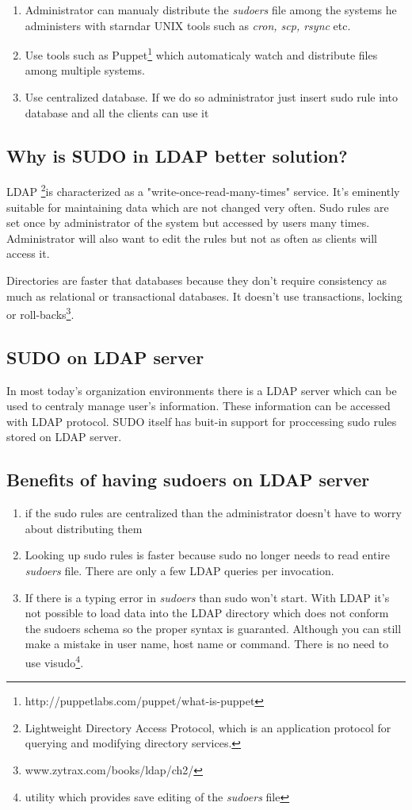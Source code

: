\documentclass[12pt,a4paper,titlepage,final]{article}
\begin{document}
\begin{enumerate} 
	\item Administrator can manualy distribute the \emph{sudoers} file among the
		systems he administers with starndar UNIX tools such as \emph{cron, scp,
		rsync} etc.
	\item Use tools such as
		Puppet\footnote{http://puppetlabs.com/puppet/what-is-puppet} which
		automaticaly watch and distribute files among multiple systems.
	\item Use centralized database. If we do so administrator just insert sudo
		rule into database and all the clients can use it
\end{enumerate}

\subsection{Why is SUDO in LDAP better solution?}
LDAP \footnote{Lightweight Directory Access Protocol, which is an application
protocol for querying and modifying directory services.}is characterized as a
"write-once-read-many-times" service. It's eminently suitable for maintaining
data which are not changed very often. Sudo rules are set once by administrator
of the system but accessed by users many times.  Administrator will also want to
edit the rules but not as often as clients will access it.

Directories are faster that databases because they don't require consistency as
much as relational or transactional databases. It doesn't use transactions,
locking or roll-backs\footnote{www.zytrax.com/books/ldap/ch2/}.


\subsection{SUDO on LDAP server}
In most today's organization environments there is a LDAP server which can be
used to centraly manage user's information. These information can be accessed
with LDAP protocol. SUDO itself has buit-in support for proccessing sudo rules
stored on LDAP server.


\subsection{Benefits of having sudoers on LDAP server}
\begin{enumerate} 
	\item if the sudo rules are centralized than the administrator doesn't have to
		worry about distributing them
	\item Looking up sudo rules is faster because sudo no longer needs to read
		entire \emph{sudoers} file. There are only a few LDAP queries per
		invocation.
	\item If there is a typing error in \emph{sudoers} than sudo won't start. With
		LDAP it's not possible to load data into the LDAP directory which does not
		conform the sudoers schema so the proper syntax is guaranted. Although you
		can still make a mistake in user name, host name or command. There is no
		need to use visudo\footnote{utility which provides save editing of the
		\emph{sudoers} file}.
\end{enumerate}
\end{document}
